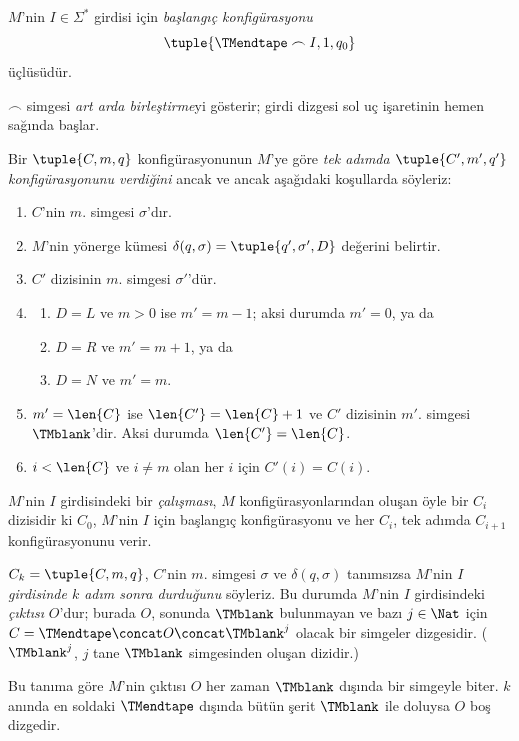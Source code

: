 \begin{defn}
$M$'nin $I\in\Sigma^*$ girdisi için \emph{başlangıç konfigürasyonu}
\[
  \tuple{\TMendtape\frown I,1,q_0}
\]
üçlüsüdür.
\end{defn}

\begin{explain}
$\frown$ simgesi \emph{art arda birleştirme}yi gösterir; girdi dizgesi sol
uç işaretinin hemen sağında başlar.
\end{explain}

\begin{defn}
Bir $\tuple{C,m,q}$ konfigürasyonunun $M$'ye göre
\emph{tek adımda $\tuple{C',m',q'}$ konfigürasyonunu verdiğini} ancak ve
ancak aşağıdaki koşullarda söyleriz:
\begin{enumerate}
\item $C$'nin $m$. simgesi $\sigma$'dır.
\item $M$'nin yönerge kümesi
  $\delta(q,\sigma)=\tuple{q',\sigma',D}$ değerini belirtir.
\item $C'$ dizisinin $m$. simgesi $\sigma'$'dür.
\item
  \begin{enumerate}
  \item $D=L$ ve $m>0$ ise $m'=m-1$; aksi durumda $m'=0$, ya da
  \item $D=R$ ve $m'=m+1$, ya da
  \item $D=N$ ve $m'=m$.
  \end{enumerate}
\item $m'=\len{C}$ ise $\len{C'}=\len{C}+1$ ve $C'$ dizisinin $m'$.
  simgesi $\TMblank$'dir. Aksi durumda $\len{C'}=\len{C}$.
\item $i<\len{C}$ ve $i\neq m$ olan her $i$ için $C'(i)=C(i)$.
\end{enumerate}
\end{defn}

\begin{defn}
$M$'nin $I$ girdisindeki bir \emph{çalışması}, $M$ konfigürasyonlarından
oluşan öyle bir $C_i$ dizisidir ki $C_0$, $M$'nin $I$ için başlangıç
konfigürasyonu ve her $C_i$, tek adımda $C_{i+1}$ konfigürasyonunu verir.

$C_k=\tuple{C,m,q}$, $C$'nin $m$. simgesi $\sigma$ ve
$\delta(q,\sigma)$ tanımsızsa $M$'nin \emph{$I$ girdisinde $k$ adım sonra
durduğunu} söyleriz. Bu durumda $M$'nin $I$ girdisindeki \emph{çıktısı}
$O$'dur; burada $O$, sonunda $\TMblank$ bulunmayan ve bazı $j\in\Nat$ için
$C=\TMendtape\concat O\concat\TMblank^j$ olacak bir simgeler dizgesidir.
($\TMblank^j$, $j$ tane $\TMblank$ simgesinden oluşan dizidir.)
\end{defn}

\begin{explain}
Bu tanıma göre $M$'nin çıktısı $O$ her zaman $\TMblank$ dışında bir simgeyle
biter. $k$ anında en soldaki $\TMendtape$ dışında bütün şerit $\TMblank$ ile
doluysa $O$ boş dizgedir.
\end{explain}

